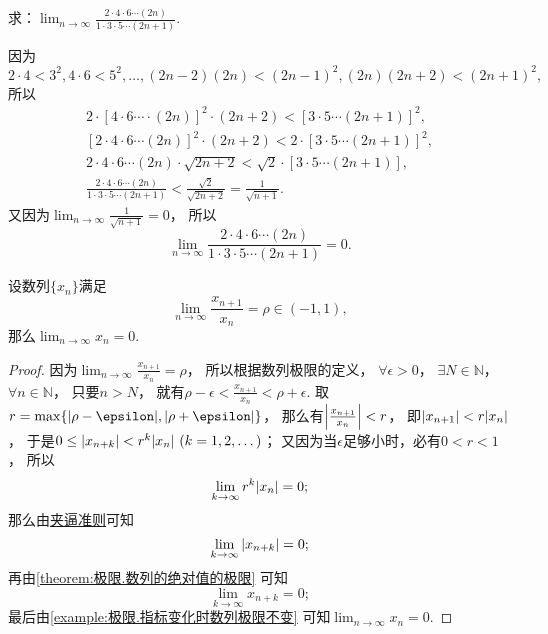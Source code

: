 \begin{example}
求：\(\lim_{n\to\infty} \frac{2 \cdot 4 \cdot 6 \dotsm (2n)}{1 \cdot 3 \cdot 5 \dotsm (2n+1)}\).
\begin{solution}
因为\[
	2 \cdot 4 < 3^2,
	4 \cdot 6 < 5^2,
	\dotsc,
	(2n-2)(2n) < (2n-1)^2,
	(2n)(2n+2) < (2n+1)^2,
\]
所以\begin{gather*}
	2 \cdot [4 \cdot 6 \dotsm \cdot (2n)]^2 \cdot (2n+2)
	< [3 \cdot 5 \dotsm (2n+1)]^2, \\
	[2 \cdot 4 \cdot 6 \dotsm (2n)]^2 \cdot (2n+2)
	< 2 \cdot [3 \cdot 5 \dotsm (2n+1)]^2, \\
	2 \cdot 4 \cdot 6 \dotsm (2n) \cdot \sqrt{2n+2}
	< \sqrt2 \cdot [3 \cdot 5 \dotsm (2n+1)], \\
	\frac{2 \cdot 4 \cdot 6 \dotsm (2n)}{1 \cdot 3 \cdot 5 \dotsm (2n+1)}
	< \frac{\sqrt2}{\sqrt{2n+2}}
	= \frac1{\sqrt{n+1}}.
\end{gather*}
又因为\(\lim_{n\to\infty} \frac1{\sqrt{n+1}} = 0\)，
所以\begin{equation}\label{equation:数列极限.重要极限5}
	\lim_{n\to\infty} \frac{2 \cdot 4 \cdot 6 \dotsm (2n)}{1 \cdot 3 \cdot 5 \dotsm (2n+1)} = 0.
\end{equation}
\end{solution}
\end{example}

\begin{proposition}
设数列\(\{x_n\}\)满足\[
	\lim_{n\to\infty} \frac{x_{n+1}}{x_n} = \rho \in (-1,1),
\]
那么\(\lim_{n\to\infty} x_n = 0\).
\begin{proof}
因为\(\lim_{n\to\infty} \frac{x_{n+1}}{x_n} = \rho\)，
所以根据数列极限的定义，
\(\forall\epsilon>0\)，
\(\exists N\in\mathbb{N}\)，
\(\forall n\in\mathbb{N}\)，
只要\(n > N\)，
就有\(\rho-\epsilon < \frac{x_{n+1}}{x_n} < \rho+\epsilon\).
取\(r=\max\{\abs{\rho-\epsilon},\abs{\rho+\epsilon}\}\)，
那么有\(\abs{\frac{x_{n+1}}{x_n}} < r\)，
即\(\abs{x_{n+1}} < r \abs{x_n}\)，
于是\(0 \leq \abs{x_{n+k}} < r^k \abs{x_n}\ (k=1,2,\dotsc)\)；
又因为当\(\epsilon\)足够小时，必有\(0<r<1\)，
所以\[
	\lim_{k\to\infty} r^k \abs{x_n} = 0;
\]
那么由\hyperref[theorem:数列极限.夹逼准则]{夹逼准则}可知\[
	\lim_{k\to\infty} \abs{x_{n+k}} = 0;
\]
再由\cref{theorem:极限.数列的绝对值的极限} 可知\[
	\lim_{k\to\infty} x_{n+k} = 0;
\]
最后由\cref{example:极限.指标变化时数列极限不变} 可知\(\lim_{n\to\infty} x_n = 0\).
\end{proof}
\end{proposition}
